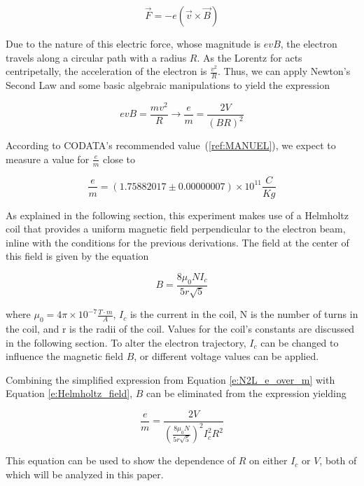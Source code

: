 \documentclass[12pt]{article}
\newcommand{\paren}[1]{\left( {#1} \right)}
\begin{document}
\begin{equation}
	\vec{F} = -e\paren{\vec{v}\times\vec{B}} \label{e:Lorentz}
\end{equation}

Due to the nature of this electric force, whose magnitude is $evB$, the electron travels along a circular path with a radius $R$. As the Lorentz for acts centripetally, the acceleration of the electron is $\frac{v^2}{R}$. Thus, we can apply Newton's Second Law and some basic algebraic manipulations to yield the expression

\begin{equation}
	evB=\frac{mv^2}{R}\rightarrow \frac{e}{m}=\frac{2V}{(BR)^2}
	\label{e:N2L_e_over_m}
\end{equation}

According to CODATA's recommended value~(\ref{ref:MANUEL}), we expect to measure a value for $\frac{e}{m}$ close to

\begin{equation*}
	\frac{e}{m}=(1.75882017\pm0.00000007)\times10^{11} \frac{C}{Kg}
\end{equation*} 

As explained in the following section, this experiment makes use of a Helmholtz coil that provides a uniform magnetic field perpendicular to the electron beam, inline with the conditions for the previous derivations. The field at the center of this field is given by the equation

\begin{equation}
	B=\frac{8\mu_0NI_c}{5r\sqrt{5}} \label{e:Helmholtz_field}
\end{equation}

\noindent where $\mu_0=4\pi\times10^{-7} \frac{T\cdot m}{A}$, $I_c$ is the current in the coil, N is the number of turns in the coil, and r is the radii of the coil. Values for the coil's constants are discussed in the following section. To alter the electron trajectory, $I_c$ can be changed to influence the magnetic field $B$, or different voltage values can be applied.

Combining the simplified expression from Equation \ref{e:N2L_e_over_m} with Equation \ref{e:Helmholtz_field}, $B$ can be eliminated from the expression yielding

\begin{equation}
	\frac{e}{m}=\frac{2V}{\paren{\frac{8\mu_0N}{5r\sqrt{5}}}^2I_c^2R^2} \label{e:em_full_expr}
\end{equation}

\noindent This equation can be used to show the dependence of $R$ on either $I_c$ or $V$, both of which will be analyzed in this paper.
\end{document}
